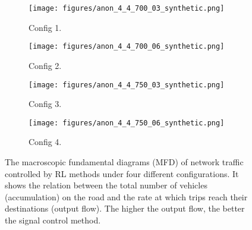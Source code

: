\begin{figure}[t!]
  \centering
        \begin{subfigure}[t]{.23\textwidth}
         \texttt{[image: figures/anon\_4\_4\_700\_03\_synthetic.png]}
                \caption{Config 1.}
                \label{fig:MFD_700_03}
        \end{subfigure}
        \hfill
        \begin{subfigure}[t]{.23\textwidth}
         \texttt{[image: figures/anon\_4\_4\_700\_06\_synthetic.png]}
                \caption{Config 2.}
                \label{fig:MFD_700_06}
        \end{subfigure}
        \hfill
        \begin{subfigure}[t]{.23\textwidth}
         \texttt{[image: figures/anon\_4\_4\_750\_03\_synthetic.png]}
                \caption{Config 3.}
                \label{fig:MFD_750_03}
        \end{subfigure}
        \hfill
        \begin{subfigure}[t]{.23\textwidth}
         \texttt{[image: figures/anon\_4\_4\_750\_06\_synthetic.png]}
                \caption{Config 4.}
                \label{fig:MFD_750_06}
        \end{subfigure}
  \caption{The macroscopic fundamental diagrams (MFD) of network traffic controlled by RL methods under four different configurations. It shows the relation between the total number of vehicles (accumulation) on the road and the rate at which trips reach their destinations (output flow). The higher the output flow, the better the signal control method.}
  \label{fig:MFD_analysis}
\end{figure}

